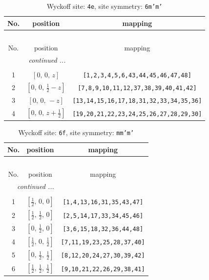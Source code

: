 \documentclass[fleqn,8pt]{jsarticle}
\begin{document}
\renewcommand{\arraystretch}{1.2}
\begin{longtable}{ccc}
\caption{Wyckoff site: {\tt 4e}, site symmetry: {\tt 6m'm'}}
 \\
 \hline \hline
No. & position & mapping \\ \hline \endfirsthead

\multicolumn{2}{l}{\tablename\ \thetable{}} \\
 \hline \hline
No. & position & mapping \\ \hline \endhead

 \hline \hline
\multicolumn{2}{r}{\footnotesize\it continued ...} \\ \endfoot

 \hline \hline
\multicolumn{2}{r}{} \\ \endlastfoot

1 & $\left[ 0,\, 0,\, z \right]$ & {\tt [1,2,3,4,5,6,43,44,45,46,47,48]} \\ \hline
2 & $\left[ 0,\, 0,\, \frac{1}{2} - z \right]$ & {\tt [7,8,9,10,11,12,37,38,39,40,41,42]} \\ \hline
3 & $\left[ 0,\, 0,\, - z \right]$ & {\tt [13,14,15,16,17,18,31,32,33,34,35,36]} \\ \hline
4 & $\left[ 0,\, 0,\, z + \frac{1}{2} \right]$ & {\tt [19,20,21,22,23,24,25,26,27,28,29,30]} \\
\end{longtable}
\renewcommand{\arraystretch}{1.2}
\begin{longtable}{ccc}
\caption{Wyckoff site: {\tt 6f}, site symmetry: {\tt mm'm'}}
 \\
 \hline \hline
No. & position & mapping \\ \hline \endfirsthead

\multicolumn{2}{l}{\tablename\ \thetable{}} \\
 \hline \hline
No. & position & mapping \\ \hline \endhead

 \hline \hline
\multicolumn{2}{r}{\footnotesize\it continued ...} \\ \endfoot

 \hline \hline
\multicolumn{2}{r}{} \\ \endlastfoot

1 & $\left[ \frac{1}{2},\, 0,\, 0 \right]$ & {\tt [1,4,13,16,31,35,43,47]} \\ \hline
2 & $\left[ \frac{1}{2},\, \frac{1}{2},\, 0 \right]$ & {\tt [2,5,14,17,33,34,45,46]} \\ \hline
3 & $\left[ 0,\, \frac{1}{2},\, 0 \right]$ & {\tt [3,6,15,18,32,36,44,48]} \\ \hline
4 & $\left[ \frac{1}{2},\, 0,\, \frac{1}{2} \right]$ & {\tt [7,11,19,23,25,28,37,40]} \\ \hline
5 & $\left[ 0,\, \frac{1}{2},\, \frac{1}{2} \right]$ & {\tt [8,12,20,24,27,30,39,42]} \\ \hline
6 & $\left[ \frac{1}{2},\, \frac{1}{2},\, \frac{1}{2} \right]$ & {\tt [9,10,21,22,26,29,38,41]} \\
\end{longtable}
\end{document}
